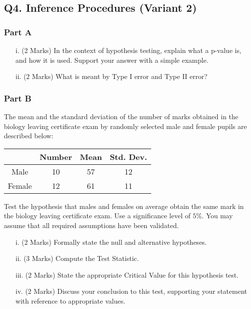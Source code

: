 \documentclass[a4paper,12pt]{article}
\begin{document}
\subsection*{Q4. Inference Procedures (Variant 2)}

\subsubsection*{Part A} %
\begin{itemize}
\item[i.](2 Marks) In the context of hypothesis testing, explain what a p-value is, and how it is used. Support your answer with a simple example.
\item[ii.](2 Marks) What is meant by Type I error and Type II error?
\end{itemize}

\subsubsection*{Part B} %
\noindent The mean and the standard deviation of the number of marks obtained in the biology leaving certificate exam by randomly selected male and female pupils are described below:\\

\begin{center}
\begin{tabular}{|c|c|c|c|}

  \hline
	&Number&	Mean&	Std. Dev.\\ \hline
Male	&10	&57	&12\\
Female	&12	&61	&11\\
  \hline
\end{tabular}
\end{center}


Test the hypothesis that males and females on average obtain the same mark in the biology leaving certificate exam. Use a significance level of $5\%$. You may assume that all required assumptions have been validated.\\%
\bigskip
\begin{itemize}
\item[i.](2 Marks) Formally state the null and alternative hypotheses.
\item[ii.](3 Marks) Compute the Test Statistic.
\item[iii.](2 Marks) State the appropriate Critical Value for this hypothesis test.
\item[iv.](2 Marks) Discuss your conclusion to this test, supporting your statement with reference to appropriate values.
\end{itemize}
\end{document}
